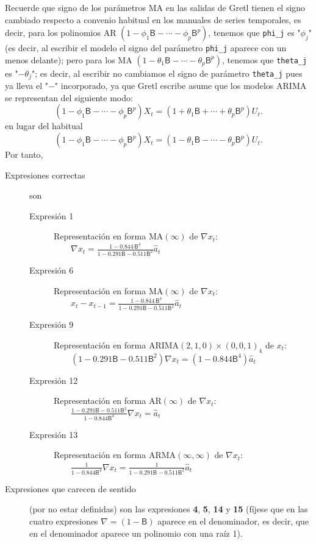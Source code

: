 \documentclass[10pt]{article}
\begin{document}
Recuerde que signo de los parámetros MA en las salidas de Gretl tienen
el signo cambiado respecto a convenio habitual en los manuales de
series temporales, es decir, para los polinomios AR
\((1-\phi_1\mathsf{B}-\cdots-\phi_p\mathsf{B}^p)\), tenemos que \texttt{phi\_j}
es "\(\phi_j\)" (es decir, al escribir el modelo el signo del parámetro
\texttt{phi\_j} aparece con un menos delante); pero para los MA
\((1-\theta_1\mathsf{B}-\cdots-\theta_p\mathsf{B}^p)\), tenemos que
\texttt{theta\_j} es "\(-\theta_j\)"; es decir, al escribir no cambiamos el
signo de parámetro \texttt{theta\_j} pues ya lleva el "\(-\)" incorporado, ya
que Gretl escribe asume que los modelos ARIMA se representan del
siguiente modo:
$$(1-\phi_1\mathsf{B}-\cdots-\phi_p\mathsf{B}^p)X_t= (1+\theta_1\mathsf{B}+\cdots+\theta_p\mathsf{B}^p)U_t.$$
en lugar del habitual
$$(1-\phi_1\mathsf{B}-\cdots-\phi_p\mathsf{B}^p)X_t= (1-\theta_1\mathsf{B}-\cdots-\theta_p\mathsf{B}^p)U_t.$$
Por tanto, 

\begin{description}
\item[{Expresiones correctas}] son

\begin{description}
\item[{Expresión 1}] Representación en forma MA\((\infty)\) de \(\nabla x_t\): \(\qquad \nabla x_t = \frac{1-0.844 \, \mathsf{B}^4}{1 - 0.291 \mathsf{B} -0.511 \mathsf{B}^2} \hat{a}_t\)
\item[{Expresión 6}] Representación en forma MA\((\infty)\) de \(\nabla x_t\): \(\qquad x_t-x_{t-1} = \frac{1-0.844 \, \mathsf{B}^4}{1 - 0.291 \mathsf{B} -0.511 \mathsf{B}^2} \hat{a}_t\)
\item[{Expresión 9}] Representación en forma ARIMA\((2,1,0)\times(0,0,1)_4\)
de \(x_t\): \newline  \(\qquad (1 - 0.291 \mathsf{B} -
    0.511 \mathsf{B}^2)\nabla x_t = (1 - 0.844 \mathsf{B}^4) \hat{a}_t\)
\item[{Expresión 12}] Representación en forma AR\((\infty)\) de \(\nabla x_t\): \(\qquad \frac{1 -0.291 \mathsf{B} - 0.511 \mathsf{B}^2}{1 - 0.844 \mathsf{B}^4}\nabla x_t = \hat{a}_t\)
\item[{Expresión 13}] Representación en forma ARMA\((\infty,\infty)\) de \(\nabla x_t\): \(\qquad\frac{1}{1 - 0.844 \mathsf{B}^4}\nabla x_t = \frac{1}{1 -0.291 \mathsf{B} - 0.511 \mathsf{B}^2} \hat{a}_t\)
\end{description}

\item[{Expresiones que carecen de sentido}] (por no estar definidas) son
las expresiones \textbf{4}, \textbf{5}, \textbf{14} y \textbf{15} (fíjese que en las cuatro
expresiones \(\nabla=(1-\mathsf{B})\) aparece en el denominador, es
decir, que en el denominador aparece un polinomio con una raíz 1).
\end{description}
\end{document}
